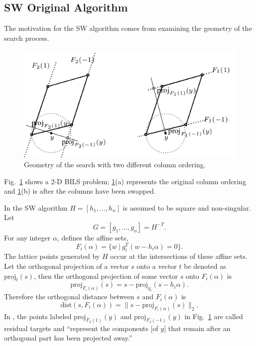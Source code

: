 \documentclass[12pt,Bold,letterpaper]{mcgilletdclass}
\newcommand{\dist}{\mathrm{dist}}
\newcommand{\vsp}{\vspace{\baselineskip}}
\begin{document}
\vsp \subsection{SW Original Algorithm} \label{subsec:SW}
The motivation for the SW algorithm comes from examining the geometry of the search process.

\ifx\du\undefined
  \newlength{\du}
\fi
\begin{figure}
\centering
\includegraphics{sumotivation.png}
\caption{Geometry of the search  with two different column ordering.}
\label{SEGeometry}
\end{figure}

Fig.\ \ref{SEGeometry} shows a 2-D BILS problem;
\ref{SEGeometry}(a) represents the original column ordering and 
\ref{SEGeometry}(b) is after the columns have been swapped.

In the SW algorithm $H=[h_1,\ldots, h_n]$ is assumed to be square and non-singular.
Let 
$$
G =[g_1,\ldots, g_n]= H^{-T}.
$$ 
For any  integer $\alpha$,   \cite{SuW05} defines the
affine sets, $$F_i(\alpha) = \{w \ | \ g_i^T(w-h_i\alpha) = 0\}.$$
The lattice points generated by $H$ occur at the intersections of these affine sets. 
Let the orthogonal projection of a vector $s$ onto a vector $t$ be denoted as
$\mbox{proj}_t(s)$, then %
the orthogonal projection of some vector $s$ onto $F_i(\alpha)$ is 
$$\mbox{proj}_{F_i(\alpha)}(s) = s -\mbox{proj}_{g_i}(s-h_i\alpha).$$ 
Therefore the orthogonal distance between $s$ and
$F_i(\alpha)$ is $$\dist(s,F_i(\alpha)) =  \| s - \mbox{proj}_{F_i(\alpha)}(s) \|_2.$$
In \cite{SuW05}, the points labeled $\mbox{proj}_{F_2(1)}(y)$ and
$\mbox{proj}_{F_2(-1)}(y)$ in Fig.\  \ref{SEGeometry}
are called residual targets  and ``represent the
components [of $y$] that remain after an orthogonal part has been projected
away.''  
\end{document}
